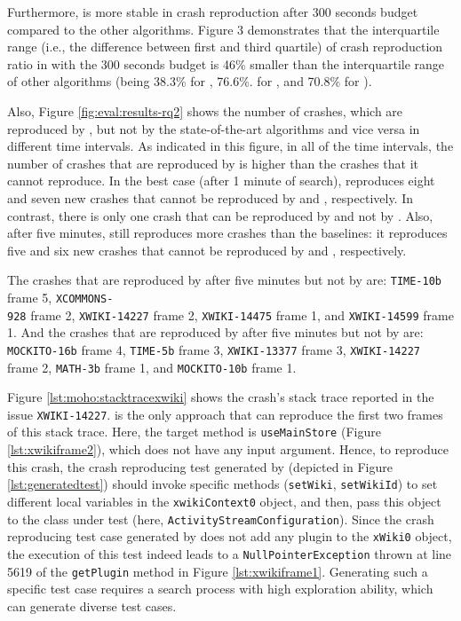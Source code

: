 Furthermore, \moho is more stable in crash reproduction after 300 seconds budget compared to the other algorithms. Figure 3 demonstrates that the interquartile range (i.e., the difference between first and third quartile) of crash reproduction ratio in \moho with the 300 seconds budget is 46\% smaller than the interquartile range of other algorithms (being 38.3\% for \moho, 76.6\%. for \SGGA, and  70.8\% for \decomposition).

Also, Figure \ref{fig:eval:results-rq2} shows the number of crashes, which are reproduced by \moho, but not by the state-of-the-art algorithms and vice versa in different time intervals.
As indicated in this figure, in all of the time intervals, the number of crashes that are reproduced by \moho is higher than the crashes that it cannot reproduce. In the best case (after 1 minute of search), \moho reproduces eight and seven new crashes that cannot be reproduced by \SGGA and \decomposition, respectively. In contrast, there is only one crash that can be reproduced by \decomposition and not by \moho. Also, after five minutes, \moho still reproduces more crashes than the baselines: it reproduces five and six new crashes that cannot be reproduced by \SGGA and \decomposition, respectively.

The crashes that are reproduced by \moho after five minutes but not by \SGGA are: \texttt{TIME-10b} frame 5, \texttt{XCOMMONS-\\928} frame 2, \texttt{XWIKI-14227} frame 2, \texttt{XWIKI-14475} frame 1, and \texttt{XWIKI-14599} frame 1. And the crashes that are reproduced by \moho after five minutes but not by \decomposition are: \texttt{MOCKITO-16b} frame 4, \texttt{TIME-5b} frame 3, \texttt{XWIKI-13377} frame 3, \texttt{XWIKI-14227} frame 2, \texttt{MATH-3b} frame 1, and \texttt{MOCKITO-10b} frame 1.

Figure \ref{lst:moho:stacktracexwiki} shows the crash's stack trace reported in the issue \texttt{X\-WI\-KI-14227}. \moho is the only approach that can reproduce the first two frames of this stack trace. Here, the target method is \texttt{useMainStore} (Figure \ref{lst:xwikiframe2}), which does not have any input argument. Hence, to reproduce this crash, the crash reproducing test generated by \moho (depicted in Figure \ref{lst:generatedtest}) should invoke specific methods (\eg \texttt{setWiki}, \texttt{setWikiId}) to set different local variables in the \texttt{xwikiContext0} object, and then, pass this object to the class under test (here, \texttt{Acti\-vi\-ty\-Stream\-Con\-fi\-gu\-ra\-tion}). Since the crash reproducing  test case generated by \moho does not add any plugin to the \texttt{xWiki0} object, the execution of this test indeed leads to a \texttt{NullPointerException} thrown at line 5619 of the \texttt{getPlugin} method in Figure \ref{lst:xwikiframe1}.
Generating such a specific test case requires a search process with high exploration ability, which can generate diverse test cases.

